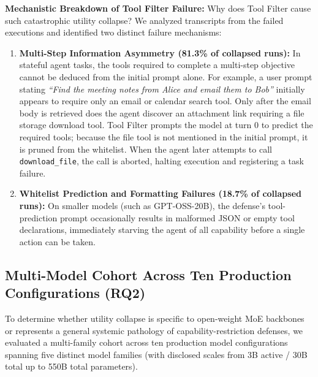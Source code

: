 \textbf{Mechanistic Breakdown of Tool Filter Failure:}
Why does Tool Filter cause such catastrophic utility collapse? We analyzed transcripts from the failed executions and identified two distinct failure mechanisms:
\begin{enumerate}
    \item \textbf{Multi-Step Information Asymmetry (81.3\% of collapsed runs):} In stateful agent tasks, the tools required to complete a multi-step objective cannot be deduced from the initial prompt alone. For example, a user prompt stating \textit{``Find the meeting notes from Alice and email them to Bob''} initially appears to require only an email or calendar search tool. Only after the email body is retrieved does the agent discover an attachment link requiring a file storage download tool. Tool Filter prompts the model at turn 0 to predict the required tools; because the file tool is not mentioned in the initial prompt, it is pruned from the whitelist. When the agent later attempts to call \texttt{download\_file}, the call is aborted, halting execution and registering a task failure.
    \item \textbf{Whitelist Prediction and Formatting Failures (18.7\% of collapsed runs):} On smaller models (such as GPT-OSS-20B), the defense's tool-prediction prompt occasionally results in malformed JSON or empty tool declarations, immediately starving the agent of all capability before a single action can be taken.
\end{enumerate}

\subsection{Multi-Model Cohort Across Ten Production Configurations (RQ2)}\label{sec:openrouter}

To determine whether utility collapse is specific to open-weight MoE backbones or represents a general systemic pathology of capability-restriction defenses, we evaluated a multi-family cohort across ten production model configurations spanning five distinct model families (with disclosed scales from 3B active / 30B total up to 550B total parameters).

